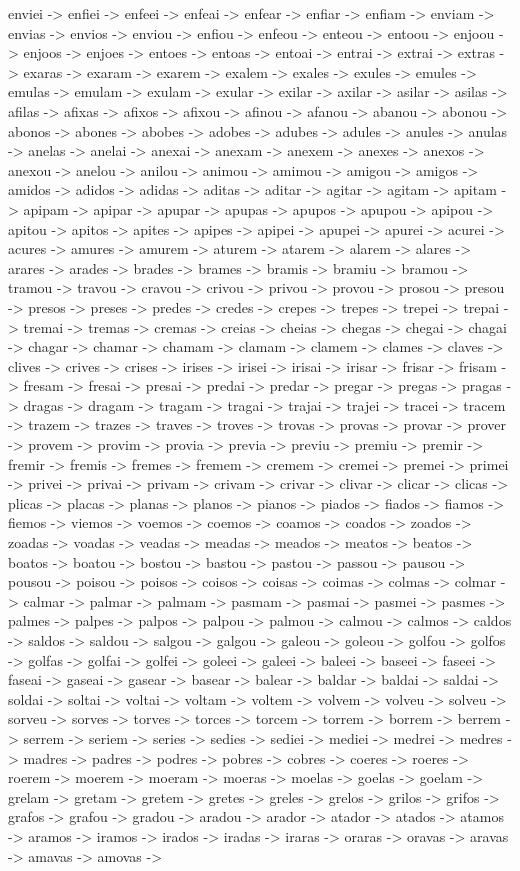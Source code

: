\documentclass[a4paper,11pt]{article}
\begin{document}
enviei -> enfiei -> enfeei -> enfeai -> enfear -> enfiar -> enfiam -> enviam -> envias -> envios -> enviou -> enfiou -> enfeou -> enteou -> entoou -> enjoou -> enjoos -> enjoes -> entoes -> entoas -> entoai -> entrai -> extrai -> extras -> exaras -> exaram -> exarem -> exalem -> exales -> exules -> emules -> emulas -> emulam -> exulam -> exular -> exilar -> axilar -> asilar -> asilas -> afilas -> afixas -> afixos -> afixou -> afinou -> afanou -> abanou -> abonou -> abonos -> abones -> abobes -> adobes -> adubes -> adules -> anules -> anulas -> anelas -> anelai -> anexai -> anexam -> anexem -> anexes -> anexos -> anexou -> anelou -> anilou -> animou -> amimou -> amigou -> amigos -> amidos -> adidos -> adidas -> aditas -> aditar -> agitar -> agitam -> apitam -> apipam -> apipar -> apupar -> apupas -> apupos -> apupou -> apipou -> apitou -> apitos -> apites -> apipes -> apipei -> apupei -> apurei -> acurei -> acures -> amures -> amurem -> aturem -> atarem -> alarem -> alares -> arares -> arades -> brades -> brames -> bramis -> bramiu -> bramou -> tramou -> travou -> cravou -> crivou -> privou -> provou -> prosou -> presou -> presos -> preses -> predes -> credes -> crepes -> trepes -> trepei -> trepai -> tremai -> tremas -> cremas -> creias -> cheias -> chegas -> chegai -> chagai -> chagar -> chamar -> chamam -> clamam -> clamem -> clames -> claves -> clives -> crives -> crises -> irises -> irisei -> irisai -> irisar -> frisar -> frisam -> fresam -> fresai -> presai -> predai -> predar -> pregar -> pregas -> pragas -> dragas -> dragam -> tragam -> tragai -> trajai -> trajei -> tracei -> tracem -> trazem -> trazes -> traves -> troves -> trovas -> provas -> provar -> prover -> provem -> provim -> provia -> previa -> previu -> premiu -> premir -> fremir -> fremis -> fremes -> fremem -> cremem -> cremei -> premei -> primei -> privei -> privai -> privam -> crivam -> crivar -> clivar -> clicar -> clicas -> plicas -> placas -> planas -> planos -> pianos -> piados -> fiados -> fiamos -> fiemos -> viemos -> voemos -> coemos -> coamos -> coados -> zoados -> zoadas -> voadas -> veadas -> meadas -> meados -> meatos -> beatos -> boatos -> boatou -> bostou -> bastou -> pastou -> passou -> pausou -> pousou -> poisou -> poisos -> coisos -> coisas -> coimas -> colmas -> colmar -> calmar -> palmar -> palmam -> pasmam -> pasmai -> pasmei -> pasmes -> palmes -> palpes -> palpos -> palpou -> palmou -> calmou -> calmos -> caldos -> saldos -> saldou -> salgou -> galgou -> galeou -> goleou -> golfou -> golfos -> golfas -> golfai -> golfei -> goleei -> galeei -> baleei -> baseei -> faseei -> faseai -> gaseai -> gasear -> basear -> balear -> baldar -> baldai -> saldai -> soldai -> soltai -> voltai -> voltam -> voltem -> volvem -> volveu -> solveu -> sorveu -> sorves -> torves -> torces -> torcem -> torrem -> borrem -> berrem -> serrem -> seriem -> series -> sedies -> sediei -> mediei -> medrei -> medres -> madres -> padres -> podres -> pobres -> cobres -> coeres -> roeres -> roerem -> moerem -> moeram -> moeras -> moelas -> goelas -> goelam -> grelam -> gretam -> gretem -> gretes -> greles -> grelos -> grilos -> grifos -> grafos -> grafou -> gradou -> aradou -> arador -> atador -> atados -> atamos -> aramos -> iramos -> irados -> iradas -> iraras -> oraras -> oravas -> aravas -> amavas -> amovas -> 
\end{document}
